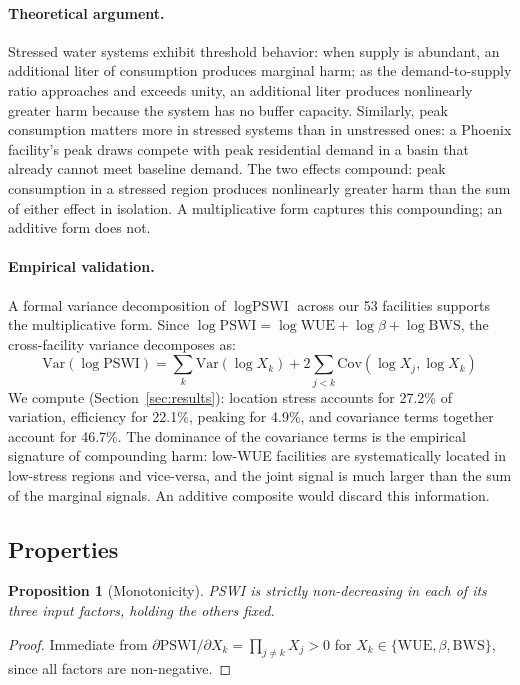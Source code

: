 \documentclass[conference,10pt]{IEEEtran}
\newtheorem{proposition}{Proposition}
\begin{document}
\paragraph{Theoretical argument.}
Stressed water systems exhibit threshold behavior: when supply is
abundant, an additional liter of consumption produces marginal harm; as
the demand-to-supply ratio approaches and exceeds unity, an additional
liter produces nonlinearly greater harm because the system has no buffer
capacity. Similarly, peak consumption matters more in stressed systems
than in unstressed ones: a Phoenix facility's peak draws compete with
peak residential demand in a basin that already cannot meet baseline
demand. The two effects compound: peak consumption in a stressed region
produces nonlinearly greater harm than the sum of either effect in
isolation. A multiplicative form captures this compounding; an additive
form does not.

\paragraph{Empirical validation.}
A formal variance decomposition of $\log\textrm{PSWI}$ across our 53
facilities supports the multiplicative form. Since
$\log\textrm{PSWI} = \log\textrm{WUE} + \log\beta + \log\textrm{BWS}$,
the cross-facility variance decomposes as:
\begin{equation}
\textrm{Var}(\log\textrm{PSWI}) =
\sum_k \textrm{Var}(\log X_k) + 2 \sum_{j<k} \textrm{Cov}(\log X_j, \log X_k)
\end{equation}
We compute (Section~\ref{sec:results}): location stress accounts for
27.2\% of variation, efficiency for 22.1\%, peaking for 4.9\%, and
covariance terms together account for 46.7\%. The dominance of the
covariance terms is the empirical signature of compounding harm: low-WUE
facilities are systematically located in low-stress regions and
vice-versa, and the joint signal is much larger than the sum of the
marginal signals. An additive composite would discard this information.

\subsection{Properties}

\begin{proposition}[Monotonicity]
PSWI is strictly non-decreasing in each of its three input factors,
holding the others fixed.
\end{proposition}
\begin{proof}
Immediate from $\partial \textrm{PSWI} / \partial X_k = \prod_{j\neq k} X_j > 0$
for $X_k \in \{\textrm{WUE}, \beta, \textrm{BWS}\}$, since all factors are
non-negative.
\end{proof}
\end{document}
